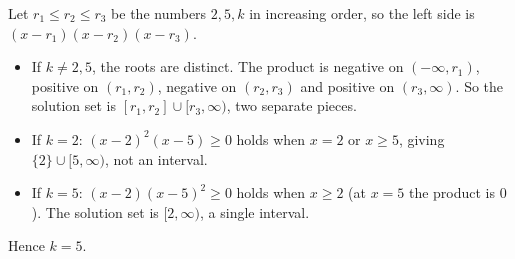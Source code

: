Let $r_1\le r_2\le r_3$ be the numbers $2,5,k$ in increasing order, so the left side is $(x-r_1)(x-r_2)(x-r_3)$.
\begin{itemize}
\item If $k\ne2,5$, the roots are distinct. The product is negative on $(-\infty,r_1)$, positive on $(r_1,r_2)$, negative on $(r_2,r_3)$ and positive on $(r_3,\infty)$. So the solution set is $[r_1,r_2]\cup[r_3,\infty)$, two separate pieces.
\item If $k=2$: $(x-2)^2(x-5)\ge0$ holds when $x=2$ or $x\ge5$, giving $\{2\}\cup[5,\infty)$, not an interval.
\item If $k=5$: $(x-2)(x-5)^2\ge0$ holds when $x\ge2$ (at $x=5$ the product is $0$). The solution set is $[2,\infty)$, a single interval.
\end{itemize}
Hence $\boxed{k=5}$.

